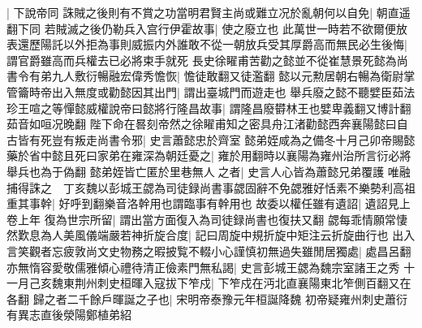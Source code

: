 |{
	下說帝同}
誅賊之後則有不賞之功當明君賢主尚或難立况於亂朝何以自免|{
	朝直遥翻下同}
若賊滅之後仍勒兵入宫行伊霍故事|{
	使之廢立也}
此萬世一時若不欲爾便放表還歷陽託以外拒為事則威振内外誰敢不從一朝放兵受其厚爵高而無民必生後悔|{
	謂官爵雖高而兵權去已必將束手就死}
長史徐矅甫苦勸之懿並不從崔慧景死懿為尚書令有弟九人敷衍暢融宏偉秀憺恢|{
	憺徒敢翻又徒濫翻}
懿以元勲居朝右暢為衛尉掌管籥時帝出入無度或勸懿因其出門|{
	謂出臺城門而遊走也}
舉兵廢之懿不聽嬖臣茹法珍王喧之等憚懿威權說帝曰懿將行隆昌故事|{
	謂隆昌廢欎林王也嬖卑義翻又博計翻茹音如咺况晚翻}
陛下命在晷刻帝然之徐矅甫知之密具舟江渚勸懿西奔襄陽懿曰自古皆有死豈有叛走尚書令邪|{
	史言蕭懿忠於齊室}
懿弟姪咸為之備冬十月己卯帝賜懿藥於省中懿且死曰家弟在雍深為朝廷憂之|{
	雍於用翻時以襄陽為雍州治所言衍必將舉兵也為于偽翻}
懿弟姪皆亡匿於里巷無人之者|{
	史言人心皆為蕭懿兄弟覆護}
唯融捕得誅之　丁亥魏以彭城王勰為司徒録尚書事勰固辭不免勰雅好恬素不樂勢利高祖重其事幹|{
	好呼到翻樂音洛幹用也謂臨事有幹用也}
故委以權任雖有遺詔|{
	遺詔見上卷上年}
復為世宗所留|{
	謂出當方面復入為司徒録尚書也復扶又翻}
勰每乖情願常悽然歎息為人美風儀端嚴若神折旋合度|{
	記曰周旋中規折旋中矩注云折旋曲行也}
出入言笑觀者忘疲敦尚文史物務之暇披覧不輟小心謹慎初無過失雖閒居獨處|{
	處昌呂翻}
亦無惰容愛敬儒雅傾心禮待清正儉素門無私謁|{
	史言彭城王勰為魏宗室諸王之秀}
十一月己亥魏東荆州刺史桓暉入寇拔下笮戍|{
	下笮戍在沔北直襄陽東北笮側百翻又在各翻}
歸之者二千餘戶暉誕之子也|{
	宋明帝泰豫元年桓誕降魏}
初帝疑雍州刺史蕭衍有異志直後滎陽鄭植弟紹

